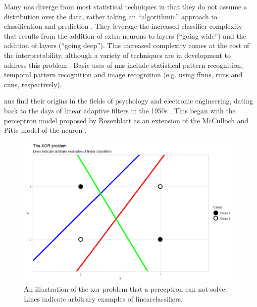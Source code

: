 \bigskip
Many \gls{nn}s diverge from most statistical techniques in that they do not assume a distribution over the data, rather taking an \enquote{algorithmic} approach to classification and prediction \cite{two_cultures}. They leverage the increased classifier complexity that results from the addition of extra neurons to layers (\enquote{going wide}) and the addition of \gls{layer}s (\enquote{going deep}). This increased complexity comes at the cost of the interpretability, although a variety of techniques are in development to address this problem \cite{nn_interpretability}. Basic uses of \gls{nn}s include statistical pattern recognition, temporal pattern recognition and image recognition (e.g. using \gls{ffnn}s, \gls{rnn}s and \gls{cnn}s, respectively).
\bigskip

\gls{nn}s find their origins in the fields of psychology and electronic engineering, dating back to the days of linear adaptive filters in the 1950s \cite{haykin}. This began with the perceptron model proposed by Rosenblatt \cite{perceptron_paper} as an extension of the McCulloch and Pitts model of the neuron \cite{logical_calculus}. 
\bigskip

\begin{figure}
    \centering
    \includegraphics[width=120mm]{figs/xor_problem.png}
    \caption[The \gls{xor} problem]{An illustration of the \gls{xor} problem that a perceptron can not solve. Lines indicate arbitrary examples of \gls{linearclassifier}s.}
    \label{fig:xor_problem}
\end{figure}

